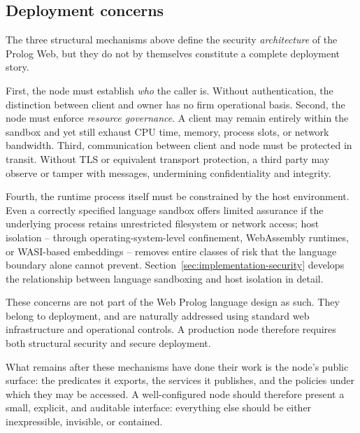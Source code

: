 \subsection{Deployment concerns}\label{sec:deployment-concerns}

The three structural mechanisms above define the security
\emph{architecture} of the Prolog Web, but they do not by themselves
constitute a complete deployment story.

First, the node must establish \emph{who} the caller is. Without
authentication, the distinction between client and owner has no firm
operational basis. Second, the node must enforce \emph{resource
governance}. A client may remain entirely within the sandbox and yet
still exhaust CPU time, memory, process slots, or network bandwidth.
Third, communication between client and node must be protected in
transit. Without TLS or equivalent transport protection, a third
party may observe or tamper with messages, undermining
confidentiality and integrity.

Fourth, the runtime process itself must be constrained by the host environment. Even a correctly specified language sandbox offers limited assurance if the underlying process retains unrestricted filesystem or network access; host isolation -- through operating-system-level confinement, WebAssembly runtimes, or WASI-based embeddings -- removes entire classes of risk that the language boundary alone cannot prevent. Section~\ref{sec:implementation-security} develops the relationship between language sandboxing and host isolation in detail.

These concerns are not part of the Web Prolog language design as
such. They belong to deployment, and are naturally addressed using
standard web infrastructure and operational controls. A production
node therefore requires both structural security and secure
deployment.

\medskip
\noindent What remains after these mechanisms have done their work is the
node's public surface: the predicates it exports, the services it
publishes, and the policies under which they may be accessed. A
well-configured node should therefore present a small, explicit, and
auditable interface: everything else should be either inexpressible,
invisible, or contained.


